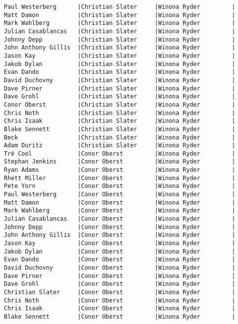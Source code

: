 \documentclass{article}
\begin{document}
\begin{verbatim}
Paul Westerberg      |Christian Slater     |Winona Ryder         |
Matt Damon           |Christian Slater     |Winona Ryder         |
Mark Wahlberg        |Christian Slater     |Winona Ryder         |
Julian Casablancas   |Christian Slater     |Winona Ryder         |
Johnny Depp          |Christian Slater     |Winona Ryder         |
John Anthony Gillis  |Christian Slater     |Winona Ryder         |
Jason Kay            |Christian Slater     |Winona Ryder         |
Jakob Dylan          |Christian Slater     |Winona Ryder         |
Evan Dando           |Christian Slater     |Winona Ryder         |
David Duchovny       |Christian Slater     |Winona Ryder         |
Dave Pirner          |Christian Slater     |Winona Ryder         |
Dave Grohl           |Christian Slater     |Winona Ryder         |
Conor Oberst         |Christian Slater     |Winona Ryder         |
Chris Noth           |Christian Slater     |Winona Ryder         |
Chris Isaak          |Christian Slater     |Winona Ryder         |
Blake Sennett        |Christian Slater     |Winona Ryder         |
Beck                 |Christian Slater     |Winona Ryder         |
Adam Duritz          |Christian Slater     |Winona Ryder         |
Tré Cool             |Conor Oberst         |Winona Ryder         |
Stephan Jenkins      |Conor Oberst         |Winona Ryder         |
Ryan Adams           |Conor Oberst         |Winona Ryder         |
Rhett Miller         |Conor Oberst         |Winona Ryder         |
Pete Yorn            |Conor Oberst         |Winona Ryder         |
Paul Westerberg      |Conor Oberst         |Winona Ryder         |
Matt Damon           |Conor Oberst         |Winona Ryder         |
Mark Wahlberg        |Conor Oberst         |Winona Ryder         |
Julian Casablancas   |Conor Oberst         |Winona Ryder         |
Johnny Depp          |Conor Oberst         |Winona Ryder         |
John Anthony Gillis  |Conor Oberst         |Winona Ryder         |
Jason Kay            |Conor Oberst         |Winona Ryder         |
Jakob Dylan          |Conor Oberst         |Winona Ryder         |
Evan Dando           |Conor Oberst         |Winona Ryder         |
David Duchovny       |Conor Oberst         |Winona Ryder         |
Dave Pirner          |Conor Oberst         |Winona Ryder         |
Dave Grohl           |Conor Oberst         |Winona Ryder         |
Christian Slater     |Conor Oberst         |Winona Ryder         |
Chris Noth           |Conor Oberst         |Winona Ryder         |
Chris Isaak          |Conor Oberst         |Winona Ryder         |
Blake Sennett        |Conor Oberst         |Winona Ryder         |

\end{verbatim}
\end{document}
